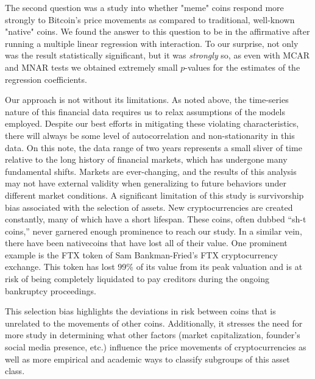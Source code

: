 \documentclass[12pt]{article}
\begin{document}
	
	The second question was a study into whether "meme" coins respond more strongly to Bitcoin's price movements as compared to traditional, well-known "native" coins. We found the answer to this question to be in the affirmative after running a multiple linear regression with interaction. To our surprise, not only was the result statistically significant, but it was \textit{strongly} so, as even with MCAR and MNAR tests we obtained extremely small $p$-values for the estimates of the regression coefficients. 
	
	Our approach is not without its limitations. As noted above, the time-series nature of this financial data requires us to relax assumptions of the models employed. Despite our best efforts in mitigating these violating characteristics, there will always be some level of autocorrelation and non-stationarity in this data. On this note, the data range of two years represents a small sliver of time relative to the long history of financial markets, which has undergone many fundamental shifts. Markets are ever-changing, and the results of this analysis may not have external validity when generalizing to future behaviors under different market conditions. A significant limitation of this study is survivorship bias associated with the selection of assets. New cryptocurrencies are created constantly, many of which have a short lifespan. These coins, often dubbed “sh-t coins,” never garnered enough prominence to reach our study. In a similar vein, there have been nativecoins that have lost all of their value. One prominent example is the FTX token of Sam Bankman-Fried’s FTX cryptocurrency exchange. This token has lost 99\% of its value from its peak valuation and is at risk of being completely liquidated to pay creditors during the ongoing bankruptcy proceedings. 
	
	This selection bias highlights the deviations in risk between coins that is unrelated to the movements of other coins. Additionally, it stresses the need for more study in determining what other factors (market capitalization, founder’s social media presence, etc.) influence the price movements of cryptocurrencies as well as more empirical and academic ways to classify subgroups of this asset class. 
	 
	\newpage 
	
\end{document}
